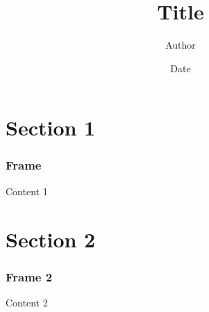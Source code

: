 \documentclass[dvipdfmx,11pt,notheorems]{beamer} %
\title{Title}
\author{Author}
\date{Date}
\begin{document}
\begin{frame}[plain]\frametitle{} %
\maketitle
\end{frame} %

\section{Section 1} %

\begin{frame} \frametitle{Frame} %
Content 1
\end{frame} %


\section{Section 2} %

\begin{frame} \frametitle{Frame 2} %
Content 2
\end{frame} %
\end{document}
